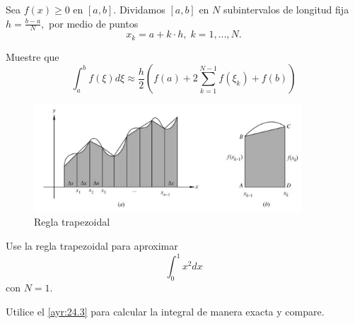  \begin{problema}
  Sea $f(x)\geq 0$ en $[a,b].$ Dividamos $[a,b]$ en $N$ subintervalos de longitud fija $h=\frac{b-a}{N},$ por medio de puntos
  $$x_{k}=a+k\cdot h, \; k=1,...,N.$$
  

  Muestre que $$
  \int_{a}^{b}f(\xi)d\xi \approx
  \frac{h}{2} \left( f(a)+2\sum_{k=1}^{N-1}f(\xi_{k})+f(b) \right)
  $$
 \end{problema}




 \begin{figure}
 \centering
 \includegraphics[width=10cm,keepaspectratio=true]{./calculo/trapezoid.png}
 \caption{Regla trapezoidal}
 \label{fig:ayr:24.2}
\end{figure}





 \begin{problema}
  Use la regla trapezoidal para aproximar
  $$
  \int_{0}^{1}x^{2}dx
  $$ con $N=1.$
  

  Utilice el \eqref{ayr:24.3} para calcular la integral de manera exacta y compare.
 \end{problema}


